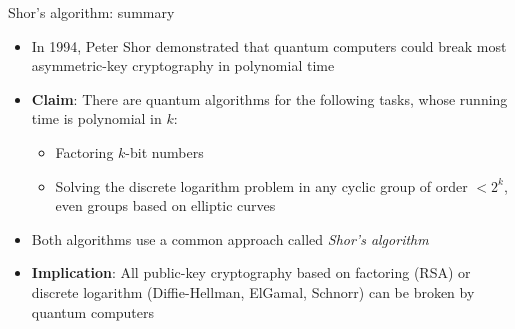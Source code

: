 \ifdefined\PRESENTATION\else\PassOptionsToClass{handout}{beamer}\fi\documentclass[aspectratio=169, lualatex]{beamer}
\begin{document}
\begin{frame}{Shor's algorithm: summary}
	\begin{itemize}
		\item In 1994, Peter Shor demonstrated that quantum computers could break most asymmetric-key cryptography in polynomial time
		\item \textbf{Claim}: There are quantum algorithms for the following tasks, whose running time is polynomial in $k$:
		      \begin{itemize}
			      \item Factoring $k$-bit numbers
			      \item Solving the discrete logarithm problem in any cyclic group of order $< 2^k$, even groups based on elliptic curves
		      \end{itemize}
		\item Both algorithms use a common approach called \textit{Shor's algorithm}
		\item \textbf{Implication}: All public-key cryptography based on factoring (RSA) or discrete logarithm (Diffie-Hellman, ElGamal, Schnorr) can be broken by quantum computers
	\end{itemize}
\end{frame}
\end{document}

